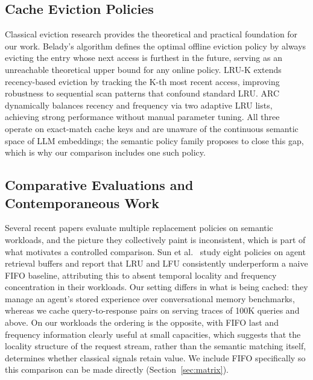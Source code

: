 \documentclass[sigconf,nonacm]{acmart}
\begin{document}
\subsection{Cache Eviction Policies}
Classical eviction research provides the theoretical and practical foundation for our work. Belady's algorithm \cite{belady1966study} defines the optimal offline eviction policy by always evicting the entry whose next access is furthest in the future, serving as an unreachable theoretical upper bound for any online policy. LRU-K \cite{oneil1993lruk} extends recency-based eviction by tracking the K-th most recent access, improving robustness to sequential scan patterns that confound standard LRU. ARC \cite{megiddo2003arc} dynamically balances recency and frequency via two adaptive LRU lists, achieving strong performance without manual parameter tuning. All three operate on exact-match cache keys and are unaware of the continuous semantic space of LLM embeddings; the semantic policy family proposes to close this gap, which is why our comparison includes one such policy.

\subsection{Comparative Evaluations and Contemporaneous Work}
Several recent papers evaluate multiple replacement policies on semantic
workloads, and the picture they collectively paint is inconsistent, which is
part of what motivates a controlled comparison. Sun et al.\
\cite{sun2026solar} study eight policies on agent retrieval buffers and
report that LRU and LFU consistently underperform a naive FIFO baseline,
attributing this to absent temporal locality and frequency concentration in
their workloads. Our setting differs in what is being cached: they manage an
agent's stored experience over conversational memory benchmarks, whereas we
cache query-to-response pairs on serving traces of 100K queries and above.
On our workloads the ordering is the opposite, with FIFO last and frequency
information clearly useful at small capacities, which suggests that the
locality structure of the request stream, rather than the semantic matching
itself, determines whether classical signals retain value. We include FIFO
specifically so this comparison can be made directly (Section~\ref{sec:matrix}).
\end{document}
